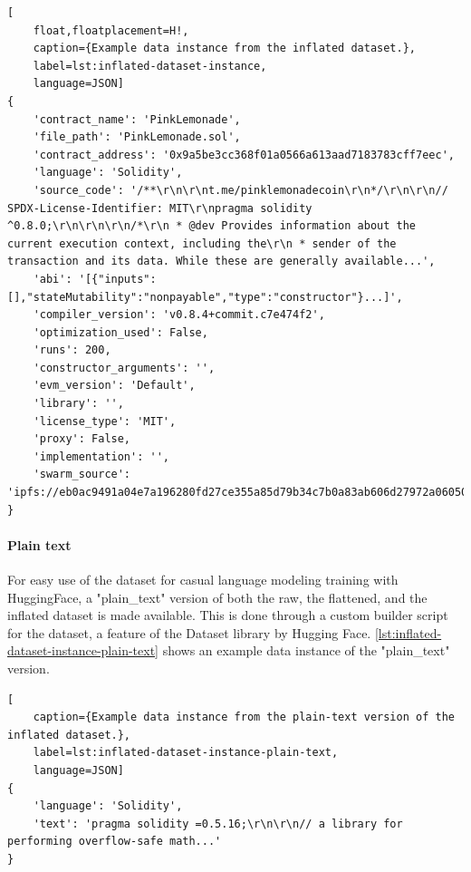 



\begin{lstlisting}[
    float,floatplacement=H!,
    caption={Example data instance from the inflated dataset.},
    label=lst:inflated-dataset-instance,
    language=JSON]
{
    'contract_name': 'PinkLemonade',
    'file_path': 'PinkLemonade.sol',
    'contract_address': '0x9a5be3cc368f01a0566a613aad7183783cff7eec',
    'language': 'Solidity',
    'source_code': '/**\r\n\r\nt.me/pinklemonadecoin\r\n*/\r\n\r\n// SPDX-License-Identifier: MIT\r\npragma solidity ^0.8.0;\r\n\r\n\r\n/*\r\n * @dev Provides information about the current execution context, including the\r\n * sender of the transaction and its data. While these are generally available...',
    'abi': '[{"inputs":[],"stateMutability":"nonpayable","type":"constructor"}...]',
    'compiler_version': 'v0.8.4+commit.c7e474f2',
    'optimization_used': False,
    'runs': 200,
    'constructor_arguments': '',
    'evm_version': 'Default',
    'library': '',
    'license_type': 'MIT',
    'proxy': False,
    'implementation': '',
    'swarm_source': 'ipfs://eb0ac9491a04e7a196280fd27ce355a85d79b34c7b0a83ab606d27972a06050c'
}
\end{lstlisting}

\paragraph{Plain text}
\label{sec:verified-smart-contracts-plain-text}
For easy use of the dataset for casual language modeling training with HuggingFace, a "plain\_text" version of both the raw, the flattened, and the inflated dataset is made available. This is done through a custom builder script for the dataset, a feature of the Dataset library by Hugging Face. \cref{lst:inflated-dataset-instance-plain-text} shows an example data instance of the "plain\_text" version.


\begin{lstlisting}[
    caption={Example data instance from the plain-text version of the inflated dataset.},
    label=lst:inflated-dataset-instance-plain-text,
    language=JSON]
{
    'language': 'Solidity',
    'text': 'pragma solidity =0.5.16;\r\n\r\n// a library for performing overflow-safe math...'
}
\end{lstlisting}

